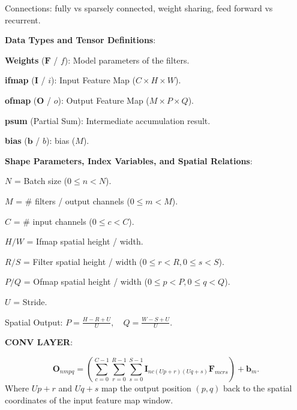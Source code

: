\begin{dashlist}
    \item Connections: fully vs sparsely connected, weight sharing, feed forward vs recurrent.
    \item \textbf{Data Types and Tensor Definitions}:
    \begin{dashlist}
        \item \textbf{Weights} ($\mathbf{F}$ / $f$): Model parameters of the filters.
        \item \textbf{ifmap} ($\mathbf{I}$ / $i$): Input Feature Map ($C \times H \times W$).
        \item \textbf{ofmap} ($\mathbf{O}$ / $o$): Output Feature Map ($M \times P \times Q$).
        \item \textbf{psum} (Partial Sum): Intermediate accumulation result.
        \item \textbf{bias} ($\mathbf{b}$ / $b$): bias ($M$).
    \end{dashlist}

    \item \textbf{Shape Parameters, Index Variables, and Spatial Relations}:
    \begin{dashlist}
        \item $N$ = Batch size ($0 \le n < N$).
        \item $M$ = \# filters / output channels ($0 \le m < M$).
        \item $C$ = \# input channels ($0 \le c < C$).
        \item $H / W$ = Ifmap spatial height / width.
        \item $R / S$ = Filter spatial height / width ($0 \le r < R, 0 \le s < S$).
        \item $P / Q$ = Ofmap spatial height / width ($0 \le p < P, 0 \le q < Q$).
        \item $U$ = Stride.
        \item Spatial Output: $P = \frac{H - R + U}{U}, \quad Q = \frac{W - S + U}{U}$.
    \end{dashlist}

    \item \textbf{CONV LAYER}: 

    \[
    \mathbf{O}_{nmpq} = \left(\sum_{c=0}^{C-1} \sum_{r=0}^{R-1} \sum_{s=0}^{S-1} \mathbf{I}_{nc(Up+r)(Uq+s)} \mathbf{F}_{mcrs}\right) + \mathbf{b}_m .
    \]
    Where $Up+r$ and $Uq+s$ map the output position $(p, q)$ back to the spatial coordinates of the input feature map window.


\end{dashlist}
